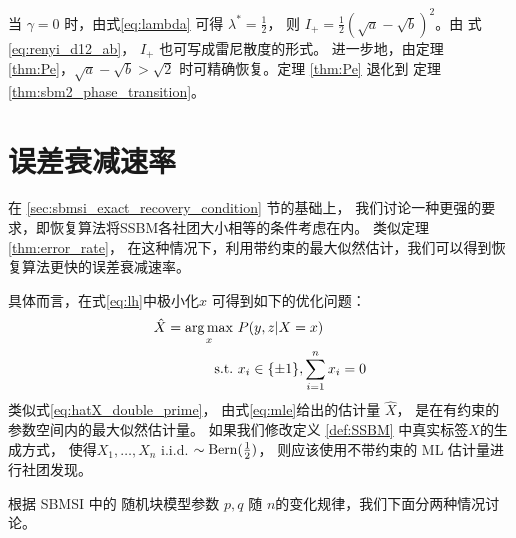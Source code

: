 \begin{remark}
当 $\gamma=0$ 时，由式\eqref{eq:lambda} 可得 $\lambda^*=\frac{1}{2}$，
则 $I_+=\frac{1}{2}\left(\sqrt{a} - \sqrt{b}\right)^2$。由 式 \eqref{eq:renyi_d12_ab}，
$I_+$ 也可写成雷尼散度的形式。
进一步地，由定理 \ref{thm:Pe}，$\sqrt{a}-\sqrt{b} > \sqrt{2}$
时可精确恢复。定理 \ref{thm:Pe} 退化到
定理 \ref{thm:sbm2_phase_transition}。
\end{remark}

\section{误差衰减速率}\label{sec:sbmsi_error_decay_rate}
在 \ref{sec:sbmsi_exact_recovery_condition} 节的基础上，
我们讨论一种更强的要求，即恢复算法将SSBM各社团大小相等的条件考虑在内。
类似定理 \ref{thm:error_rate}，
在这种情况下，利用带约束的最大似然估计，我们可以得到恢复算法更快的误差衰减速率。

具体而言，在式\eqref{eq:lh}中极小化$x$
可得到如下的优化问题：
\begin{align}
    \hat{X} = \operatorname*{arg\,max}_x\ & P(y,z|X=x) \notag \\
    \textrm{s.t.} \ & x_i \in \{\pm 1\}, \sum_{i=1}^n x_i=0 \label{eq:mle}
\end{align}
类似式\eqref{eq:hatX_double_prime}，
由式\eqref{eq:mle}给出的估计量 $\hat{X}$，
是在有约束的参数空间内的最大似然估计量。
如果我们修改定义 \ref{def:SSBM} 中真实标签$X$的生成方式，
使得$X_1, \dots, X_n$ i.i.d. $\sim \operatorname{Bern}(\frac{1}{2})$，
则应该使用不带约束的 ML 估计量进行社团发现。

根据 SBMSI 中的 随机块模型参数 $p,q$ 随 $n$的变化规律，我们下面分两种情况讨论。
